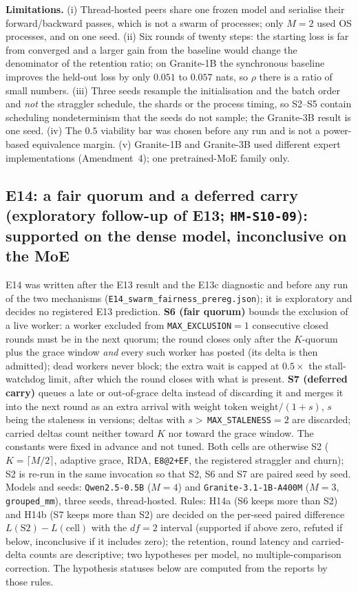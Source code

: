 \documentclass[11pt,a4paper]{article}
\begin{document}
\textbf{Limitations.} (i) Thread-hosted peers share one frozen model and serialise their forward/backward passes, which is not a swarm of processes; only $M=2$ used OS processes, and on one seed. (ii) Six rounds of twenty steps: the starting loss is far from converged and a larger gain from the baseline would change the denominator of the retention ratio; on Granite-1B the synchronous baseline improves the held-out loss by only $0.051$ to $0.057$ nats, so $\rho$ there is a ratio of small numbers. (iii) Three seeds resample the initialisation and the batch order and \emph{not} the straggler schedule, the shards or the process timing, so S2--S5 contain scheduling nondeterminism that the seeds do not sample; the Granite-3B result is one seed. (iv) The $0.5$ viability bar was chosen before any run and is not a power-based equivalence margin. (v) Granite-1B and Granite-3B used different expert implementations (Amendment~4); one pretrained-MoE family only.

\subsection{E14: a fair quorum and a deferred carry (exploratory follow-up of E13; \texttt{HM-S10-09}): supported on the dense model, inconclusive on the MoE}
\label{sec:e14}

E14 was written after the E13 result and the E13c diagnostic and before any run of the two mechanisms (\texttt{E14\_swarm\_fairness\_prereg.json}); it is exploratory and decides no registered E13 prediction. \textbf{S6 (fair quorum)} bounds the exclusion of a live worker: a worker excluded from \texttt{MAX\_EXCLUSION}$=1$ consecutive closed rounds must be in the next quorum; the round closes only after the $K$-quorum plus the grace window \emph{and} every such worker has posted (its delta is then admitted); dead workers never block; the extra wait is capped at $0.5\times$ the stall-watchdog limit, after which the round closes with what is present. \textbf{S7 (deferred carry)} queues a late or out-of-grace delta instead of discarding it and merges it into the next round as an extra arrival with weight $\text{token weight}/(1+s)$, $s$ being the staleness in versions; deltas with $s>$\,\texttt{MAX\_STALENESS}$=2$ are discarded; carried deltas count neither toward $K$ nor toward the grace window. The constants were fixed in advance and not tuned. Both cells are otherwise S2 ($K=\lceil M/2\rceil$, adaptive grace, RDA, \texttt{E8@2+EF}, the registered straggler and churn); S2 is re-run in the same invocation so that S2, S6 and S7 are paired seed by seed. Models and seeds: \texttt{Qwen2.5-0.5B} ($M=4$) and \texttt{Granite-3.1-1B-A400M} ($M=3$, \texttt{grouped\_mm}), three seeds, thread-hosted. Rules: H14a (S6 keeps more than S2) and H14b (S7 keeps more than S2) are decided on the per-seed paired difference $L(\mathrm{S2})-L(\mathrm{cell})$ with the $df=2$ interval (supported if above zero, refuted if below, inconclusive if it includes zero); the retention, round latency and carried-delta counts are descriptive; two hypotheses per model, no multiple-comparison correction. The hypothesis statuses below are computed from the reports by those rules.
\end{document}
